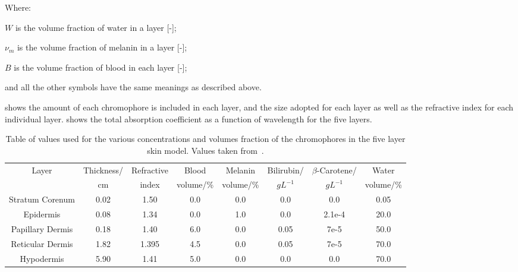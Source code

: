 \noindent Where:

\indent $W$ is the volume fraction of water in a layer [-];

\indent $\nu_m$ is the volume fraction of melanin in a layer [-];

\indent $B$ is the volume fraction of blood in each layer [-];

\indent and all the other symbols have the same meanings as described above.

\medskip

 shows the amount of each chromophore is included in each layer, and the size adopted for each layer as well as the refractive index for each individual layer.
 shows the total absorption coefficient as a function of wavelength for the five layers.


\begin{table}[!tbhp] 
    \begin{adjustwidth}{-.5in}{-.5in}  

  \begin{center}
  \begin{tabular}{|c|c|c|c|c|c|c|c|}
  \hline
  Layer & Thickness/ & Refractive & Blood & Melanin & Bilirubin/ & $\beta$-Carotene/ & Water\\
    &cm & index & volume/\% & volume/\% & $gL^{-1}$ & $gL^{-1}$ & volume/\%\\
  \hline
  Stratum Corenum  & 0.02 & 1.50  & 0.0 & 0.0 & 0.0  & 0.0 & 0.05\\
  Epidermis        & 0.08 & 1.34  & 0.0 & 1.0 & 0.0  & 2.1e-4 & 20.0\\
  Papillary Dermis & 0.18 & 1.40  & 6.0 & 0.0 & 0.05 & 7e-5 & 50.0\\
  Reticular Dermis & 1.82 & 1.395 & 4.5 & 0.0 & 0.05 & 7e-5 & 70.0\\
  Hypodermis       & 5.90 & 1.41  & 5.0 & 0.0 & 0.0  & 0.0 & 70.0\\

  \hline
  \end{tabular}
    \caption{Table of values used for the various concentrations and volumes fraction of the chromophores in the five layer skin model. Values taken from~\cite{krishnaswamy2004biophysically,meglinski2002quantitative,campbell20153d,iglesias2015biophysically}.}
  \label{tab:optpropsvals}
  \end{center}
      \end{adjustwidth}

\end{table}


